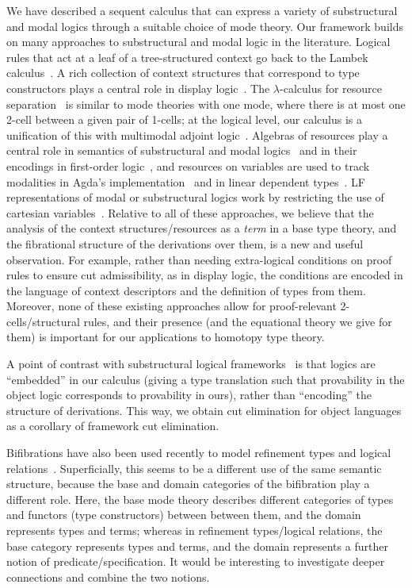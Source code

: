 \documentclass[a4paper,USenglish,numberwithinsect]{lipics-v2016}
\begin{document}
We have described a sequent calculus that can express a variety of
substructural and modal logics through a suitable choice of mode theory.
Our framework builds on many approaches to substructural and modal logic
in the literature.  Logical rules that act at a leaf of a
tree-structured context go back to the Lambek
calculus~\cite{lambek58calculus}.  A rich collection of context
structures that correspond to type constructors plays a central role in
display logic~\cite{belnap82display}.  The $\lambda$-calculus for
resource separation~\cite{atkey04separation} is similar to mode theories
with one mode, where there is at most one 2-cell between a given pair of
1-cells; at the logical level, our calculus is a unification of this
with multimodal adjoint logic~\cite{reed09adjoint}.  Algebras of
resources play a central role in semantics of substructural and modal
logics~\cite{restall00introduction} and in their encodings in first-order
logic~\cite{reed09constructiveresource}, and resources on variables are
used to track modalities in Agda's implementation~\cite{abel15modal} and
in linear dependent types~\cite{mcbride16nuttin}.  LF representations of
modal or substructural logics work by restricting the use of cartesian
variables~\cite{crary10substructural}.  Relative to all of these
approaches, we believe that the analysis of the context
structures/resources as a \emph{term} in a base type theory, and the
fibrational structure of the derivations over them, is a new and useful
observation.  For example, rather than needing extra-logical conditions
on proof rules to ensure cut admissibility, as in display logic, the
conditions are encoded in the language of context descriptors and the
definition of types from them.  Moreover, none of these existing
approaches allow for proof-relevant 2-cells/structural rules, and their
presence (and the equational theory we give for them) is important for
our applications to homotopy type theory.

A point of contrast with substructural logical
frameworks~\cite{cervesatopfenning02llf,watkins+03clf-tr,reed09thesis}
is that logics are ``embedded'' in our calculus (giving a type
translation such that provability in the object logic corresponds to
provability in ours), rather than ``encoding'' the structure of
derivations.  This way, we obtain cut elimination for object languages
as a corollary of framework cut elimination.

Bifibrations have also been used recently to model refinement types and
logical
relations~\cite{zeilberger14functors,zeilbergermelies17presheaf,johann15bifibrational}.
Superficially, this seems to be a different use of the same semantic
structure, because the base and domain categories of the bifibration
play a different role.  Here, the base mode theory describes different
categories of types and functors (type constructors) between between
them, and the domain represents types and terms; whereas in refinement
types/logical relations, the base category represents types and terms,
and the domain represents a further notion of predicate/specification.
It would be interesting to investigate deeper connections and combine
the two notions.
\end{document}
